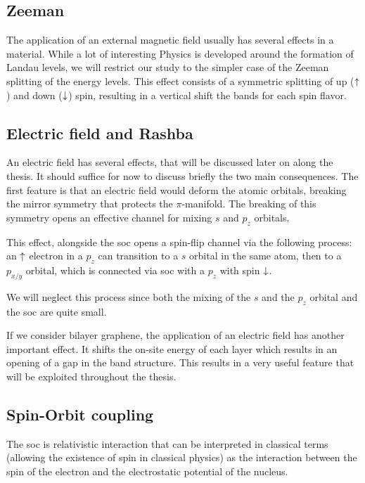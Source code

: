 \subsection{Zeeman}
The application of an external magnetic field usually has several effects in a material. While a lot of interesting Physics is developed around the formation of Landau levels, we will restrict our study to the simpler case of the Zeeman splitting of the energy levels. This effect consists of a symmetric splitting of up ($\uparrow$) and down ($\downarrow$) spin, resulting in a vertical shift the bands for each spin flavor.

\subsection{Electric field and Rashba}
An electric field has several effects, that will be discussed later on along the thesis. It should suffice for now to discuss briefly the two main consequences.
The first feature is that an electric field would deform the atomic orbitals, breaking the mirror symmetry that protects the $\pi$-manifold. The breaking of this symmetry opens an effective channel for mixing $s$ and $p_z$ orbitals.

This effect, alongside the \ac{soc} opens a spin-flip channel via the following process: an $\uparrow$ electron in a $p_z$ can transition to a $s$ orbital in the same atom, then to a $p_{x/y}$ orbital, which is connected via \ac{soc} with a $p_z$ with spin $\downarrow$.

We will neglect this process since both the mixing of the $s$ and the $p_z$ orbital\cite{Min2006} and the \ac{soc}\cite{Kane2005, Yao2007, Boettger2007,Gmitra2009} are quite small.

If we consider bilayer graphene, the application of an electric field has another important effect. It shifts the on-site energy of each layer which results in an opening of a gap in the band structure. This results in a very useful feature that will be exploited throughout the thesis.


\subsection{Spin-Orbit coupling}
\label{sec:soc}
The \acf{soc} is relativistic interaction that can be interpreted in classical terms (allowing the existence of spin in classical physics) as the interaction between the spin of the electron and the electrostatic potential of the nucleus.

